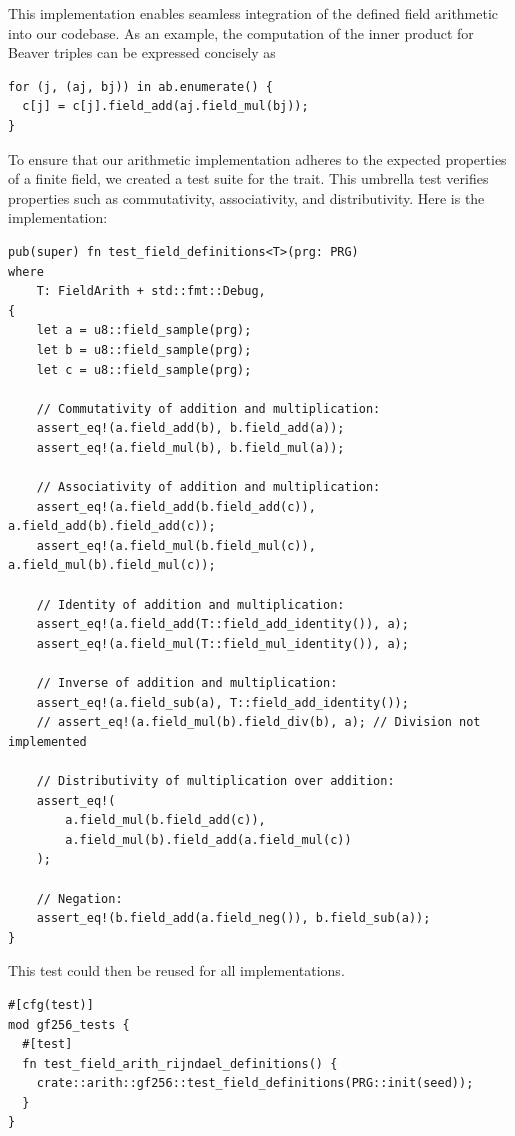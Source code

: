 \documentclass[11pt]{report}
\theoremstyle{definition}
\theoremstyle{plain}
\begin{document}
This implementation enables seamless integration of the defined field arithmetic into our codebase.
As an example, the computation of the inner product for Beaver triples can be expressed concisely as

\begin{verbatim}
for (j, (aj, bj)) in ab.enumerate() {
  c[j] = c[j].field_add(aj.field_mul(bj));
}
\end{verbatim}

To ensure that our arithmetic implementation adheres to the expected properties of a finite field, we created a test suite for the trait. This umbrella test verifies properties such as commutativity, associativity, and distributivity. Here is the implementation:

\begin{verbatim}
pub(super) fn test_field_definitions<T>(prg: PRG)
where
    T: FieldArith + std::fmt::Debug,
{
    let a = u8::field_sample(prg);
    let b = u8::field_sample(prg);
    let c = u8::field_sample(prg);

    // Commutativity of addition and multiplication:
    assert_eq!(a.field_add(b), b.field_add(a));
    assert_eq!(a.field_mul(b), b.field_mul(a));

    // Associativity of addition and multiplication:
    assert_eq!(a.field_add(b.field_add(c)), a.field_add(b).field_add(c));
    assert_eq!(a.field_mul(b.field_mul(c)), a.field_mul(b).field_mul(c));

    // Identity of addition and multiplication:
    assert_eq!(a.field_add(T::field_add_identity()), a);
    assert_eq!(a.field_mul(T::field_mul_identity()), a);

    // Inverse of addition and multiplication:
    assert_eq!(a.field_sub(a), T::field_add_identity());
    // assert_eq!(a.field_mul(b).field_div(b), a); // Division not implemented

    // Distributivity of multiplication over addition:
    assert_eq!(
        a.field_mul(b.field_add(c)),
        a.field_mul(b).field_add(a.field_mul(c))
    );

    // Negation:
    assert_eq!(b.field_add(a.field_neg()), b.field_sub(a));
}
\end{verbatim}

This test could then be reused for all  implementations.

\begin{verbatim}
#[cfg(test)]
mod gf256_tests {
  #[test]
  fn test_field_arith_rijndael_definitions() {
    crate::arith::gf256::test_field_definitions(PRG::init(seed));
  }
}
\end{verbatim}
\end{document}
